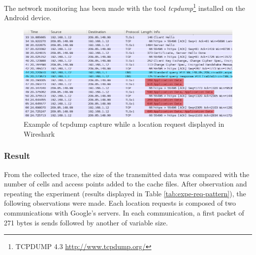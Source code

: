 The network monitoring has been made with the tool \emph{tcpdump}\footnote{TCPDUMP 4.3 \url{http://www.tcpdump.org/}} installed on the Android device.

\begin{figure}[h]
  \centering
  \includegraphics[width=\textwidth]{images/trace2.png}
  \caption{Example of tcpdump capture while a location request displayed in Wireshark}
  \label{fig:loc-req-tcpdump}
\end{figure}

\subsubsection{Result}

From the collected trace, the size of the transmitted data was compared with the number of cells and access points added to the cache files.
After observation and repeating the experiment (results displayed in Table \ref{tab:expe-req-pattern}), the following observations were made.
Each location requests is composed of two communications with Google's servers.
In each communication, a first packet of 271 bytes is sends followed by another of variable size.\\


